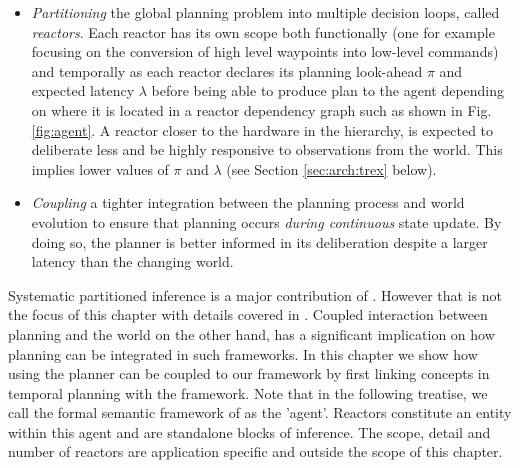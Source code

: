 \begin{itemize}

\item \emph{Partitioning} the global planning problem into multiple
  decision loops, called {\em reactors}. Each reactor has its own
  scope both functionally (one for example focusing on the conversion
  of high level waypoints into low-level commands) and temporally as
  each reactor declares its planning look-ahead $\pi$ and expected
  latency $\lambda$ before being able to produce plan to the agent
  depending on where it is located in a reactor dependency graph such
  as shown in Fig. \ref{fig:agent}. A reactor closer to the hardware
  in the hierarchy, is expected to deliberate less and be highly
  responsive to observations from the world. This implies lower values
  of $\pi$ and $\lambda$ (see Section \ref{sec:arch:trex} below).

\item \emph{Coupling} a tighter integration between the planning
  process and world evolution to ensure that planning occurs
  \emph{during continuous} state update. By doing so, the planner is
  better informed in its deliberation despite a larger latency than
  the changing world.

\end{itemize}

Systematic partitioned inference is a major contribution of
\rx. However that is not the focus of this chapter with details
covered in \cite{py10, rajan12}. Coupled interaction between planning
and the world on the other hand, has a significant implication on how
planning can be integrated in such frameworks. In this chapter we show
how using the \eu planner can be coupled to our framework by first
linking concepts in temporal planning with the \rx framework. Note
that in the following treatise, we call the formal semantic framework
of \rx as the 'agent'. Reactors constitute an entity within this agent
and are standalone blocks of inference. The scope, detail and number
of reactors are application specific and outside the scope of this
chapter.


